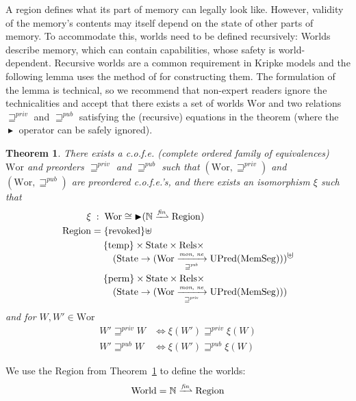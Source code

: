 \documentclass[compsoc,conference,letterpaper,fleqn]{IEEEtran}
\newtheorem{theorem}{Theorem}
\newcommand{\finparfun}{\xrightharpoonup{\textit{\tiny{fin}}}}
\newcommand{\fun}{\rightarrow}
\newcommand{\blater}{\mathop{\blacktriangleright}}
\newcommand{\cofe}{c.o.f.e.}
\newcommand{\cofes}{\cofe{}'s}
\newcommand\lau[1]{{\color{purple} \sf \footnotesize {LS: #1}}\\}
\newcommand\dominique[1]{{\color{purple} \sf \footnotesize {DD: #1}}\\}
\renewcommand\lau[1]{}
\renewcommand\dominique[1]{}
\newcommand{\var}[1]{\mathit{#1}}
\newcommand{\futurewk}{\mathbin{\sqsupseteq}^{\var{pub}}}
\newcommand{\futurestr}{\mathbin{\sqsupseteq}^{\var{priv}}}
\newcommand{\monwknefun}{\xrightarrow[\text{\tiny{$\futurewk$}}]{\textit{\tiny{mon, ne}}}}
\newcommand{\monstrnefun}{\xrightarrow[\text{\tiny{$\futurestr$}}]{\textit{\tiny{mon, ne}}}}
\newcommand{\plaindom}[1]{\mathrm{#1}}
\newcommand{\HeapSegments}{\plaindom{MemSeg}}
\newcommand{\nats}{\mathbb{N}}
\newcommand{\Rels}{\plaindom{Rels}}
\newcommand{\States}{\plaindom{State}}
\newcommand{\Regions}{\plaindom{Region}}
\newcommand{\Worlds}{\plaindom{World}}
\newcommand{\Wor}{\plaindom{Wor}}
\newcommand{\UPred}[1]{\plaindom{UPred}(#1)}
\newcommand{\plainview}[1]{\mathrm{#1}}
\newcommand{\perma}{\plainview{perm}}
\newcommand{\temp}{\plainview{temp}}
\newcommand{\revoked}{\plainview{revoked}}
\begin{document}
A region defines what its part of memory can legally look like. However,
validity of the memory's contents may itself depend on the state of other parts
of memory. To accommodate this, worlds need to be defined recursively: Worlds
describe memory, which can contain capabilities, whose safety is
world-dependent. Recursive worlds are a common requirement in Kripke models and
the following lemma uses the method of
\citet{Birkedal:2011:SKM:1926385.1926401,Birkedal:tutorial-notes} for
constructing them. The formulation of the lemma is technical, so we recommend
that non-expert readers ignore the technicalities and accept that there exists a
set of worlds $\Wor$ and two relations $\futurestr$ and $\futurewk$ satisfying
the (recursive) equations in the theorem (where the $\blater$ operator can be
safely ignored).
\begin{theorem}\label{thm:world-existence}
  There exists a \cofe{} (complete ordered family of equivalences) $\Wor$ and preorders $\futurestr$ and
  $\futurewk$ such that $(\Wor,\futurestr)$ and $(\Wor,\futurewk)$ are
  preordered \cofes{}, and there exists an isomorphism $\xi$ such that
  \begin{align*}
      \xi &\; : \; \Wor \cong \blater (\nats \finparfun \Regions)\\
      \Regions & = \{\revoked\} \uplus \\
                 &\;\quad \begin{multlined}
                     \{\temp\} \times \States \times \Rels \times \\
                     (\States \fun (\Wor \monwknefun \UPred{\HeapSegments}))
                   \end{multlined} \uplus \\
                 &\;\quad \begin{multlined}
                     \{\perma\} \times \States \times \Rels \times \\
                     (\States \fun (\Wor \monstrnefun \UPred{\HeapSegments}))
                   \end{multlined}
    \end{align*}
  and for $W, W' \in \Wor$
  \begin{align*}
    W' \futurestr W & \Leftrightarrow \xi(W') \futurestr \xi(W)   \\
    W' \futurewk W & \Leftrightarrow \xi(W') \futurewk \xi(W)
  \end{align*}
\end{theorem}
We use the $\Regions$ from Theorem~\ref{thm:world-existence} to define
the worlds:
\[
  \Worlds = \nats \finparfun \Regions
\]
\end{document}
